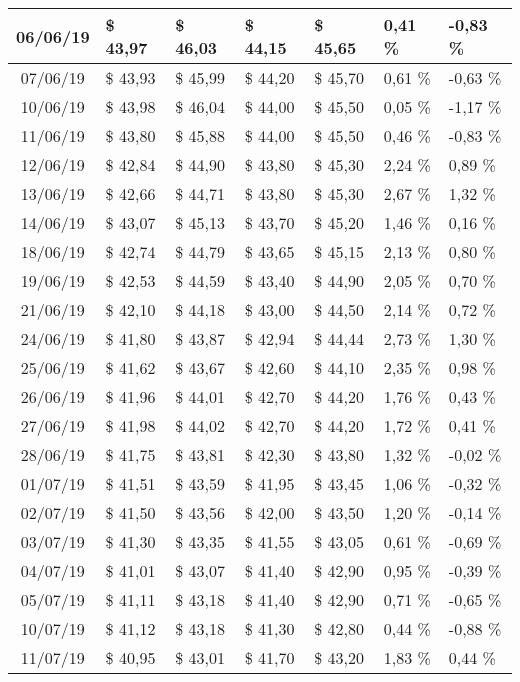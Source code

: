 \begin{center}
\begin{longtable}{|c|p{1.5cm}|p{1.5cm}|p{1.5cm}|p{1.5cm}|p{1.5cm}|p{1.5cm}|}
06/06/19 & \$ 43,97 & \$ 46,03 & \$ 44,15 & \$ 45,65 & 0,41 \% & -0,83 \% \\ \hline
07/06/19 & \$ 43,93 & \$ 45,99 & \$ 44,20 & \$ 45,70 & 0,61 \% & -0,63 \% \\ \hline
10/06/19 & \$ 43,98 & \$ 46,04 & \$ 44,00 & \$ 45,50 & 0,05 \% & -1,17 \% \\ \hline
11/06/19 & \$ 43,80 & \$ 45,88 & \$ 44,00 & \$ 45,50 & 0,46 \% & -0,83 \% \\ \hline
12/06/19 & \$ 42,84 & \$ 44,90 & \$ 43,80 & \$ 45,30 & 2,24 \% & 0,89 \% \\ \hline
13/06/19 & \$ 42,66 & \$ 44,71 & \$ 43,80 & \$ 45,30 & 2,67 \% & 1,32 \% \\ \hline
14/06/19 & \$ 43,07 & \$ 45,13 & \$ 43,70 & \$ 45,20 & 1,46 \% & 0,16 \% \\ \hline
18/06/19 & \$ 42,74 & \$ 44,79 & \$ 43,65 & \$ 45,15 & 2,13 \% & 0,80 \% \\ \hline
19/06/19 & \$ 42,53 & \$ 44,59 & \$ 43,40 & \$ 44,90 & 2,05 \% & 0,70 \% \\ \hline
21/06/19 & \$ 42,10 & \$ 44,18 & \$ 43,00 & \$ 44,50 & 2,14 \% & 0,72 \% \\ \hline
24/06/19 & \$ 41,80 & \$ 43,87 & \$ 42,94 & \$ 44,44 & 2,73 \% & 1,30 \% \\ \hline
25/06/19 & \$ 41,62 & \$ 43,67 & \$ 42,60 & \$ 44,10 & 2,35 \% & 0,98 \% \\ \hline
26/06/19 & \$ 41,96 & \$ 44,01 & \$ 42,70 & \$ 44,20 & 1,76 \% & 0,43 \% \\ \hline
27/06/19 & \$ 41,98 & \$ 44,02 & \$ 42,70 & \$ 44,20 & 1,72 \% & 0,41 \% \\ \hline
28/06/19 & \$ 41,75 & \$ 43,81 & \$ 42,30 & \$ 43,80 & 1,32 \% & -0,02 \% \\ \hline
01/07/19 & \$ 41,51 & \$ 43,59 & \$ 41,95 & \$ 43,45 & 1,06 \% & -0,32 \% \\ \hline
02/07/19 & \$ 41,50 & \$ 43,56 & \$ 42,00 & \$ 43,50 & 1,20 \% & -0,14 \% \\ \hline
03/07/19 & \$ 41,30 & \$ 43,35 & \$ 41,55 & \$ 43,05 & 0,61 \% & -0,69 \% \\ \hline
04/07/19 & \$ 41,01 & \$ 43,07 & \$ 41,40 & \$ 42,90 & 0,95 \% & -0,39 \% \\ \hline
05/07/19 & \$ 41,11 & \$ 43,18 & \$ 41,40 & \$ 42,90 & 0,71 \% & -0,65 \% \\ \hline
10/07/19 & \$ 41,12 & \$ 43,18 & \$ 41,30 & \$ 42,80 & 0,44 \% & -0,88 \% \\ \hline
11/07/19 & \$ 40,95 & \$ 43,01 & \$ 41,70 & \$ 43,20 & 1,83 \% & 0,44 \% \\ \hline

\end{longtable}
\end{center}
